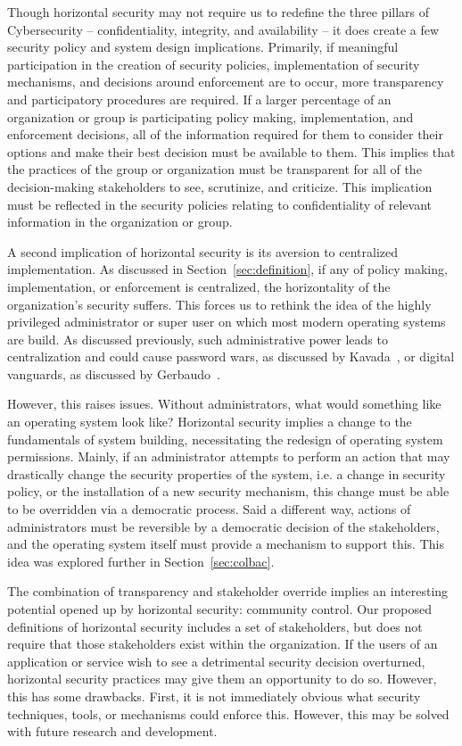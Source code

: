 Though horizontal security may not require us to redefine the three pillars of
Cybersecurity -- confidentiality, integrity, and availability -- it does create
a few security policy and system design implications. Primarily, if meaningful
participation in the creation of security policies, implementation of security
mechanisms, and decisions around enforcement are to occur, more transparency and
participatory procedures are required. If a larger percentage of an organization
or group is participating policy making, implementation, and enforcement 
decisions, all of the information required for them to consider their options
and make their best decision must be available to them. This implies that the
practices of the group or organization must be transparent for all of the
decision-making stakeholders to see, scrutinize, and criticize. This implication
must be reflected in the security policies relating to confidentiality of
relevant information in the organization or group.

A second implication of horizontal security is its aversion to centralized
implementation. As discussed in Section~\ref{sec:definition}, if any of policy
making, implementation, or enforcement is centralized, the horizontality of the
organization's security suffers. This forces us to rethink the idea of the
highly privileged administrator or super user on which most modern operating
systems are build. As discussed previously, such administrative power leads to
centralization and could cause password wars, as discussed by 
Kavada~\cite{kavada2020counterpublics}, or digital vanguards, as discussed by 
Gerbaudo~\cite{gerbaudo2017social}.

However, this raises issues. Without administrators, what would something like
an operating system look like? Horizontal security implies a change to the 
fundamentals of system building, necessitating the redesign of operating system
permissions. Mainly, if an administrator attempts to perform an action that may
drastically change the security properties of the system, i.e. a change in
security policy, or the installation of a new security mechanism, this change
must be able to be overridden via a democratic process. Said a different way,
actions of administrators must be reversible by a democratic decision of the 
stakeholders, and the operating system itself must provide a mechanism to
support this. This idea was explored further in Section~\ref{sec:colbac}.

The combination of transparency and stakeholder override implies an interesting
potential opened up by horizontal security: community control. Our proposed
definitions of horizontal security includes a set of stakeholders, but does not
require that those stakeholders exist within the organization. If the users of
an application or service wish to see a detrimental security decision
overturned, horizontal security practices may give them an opportunity to do so.
However, this has some drawbacks. First, it is not immediately obvious what
security techniques, tools, or mechanisms could enforce this. However, this may
be solved with future research and development.

